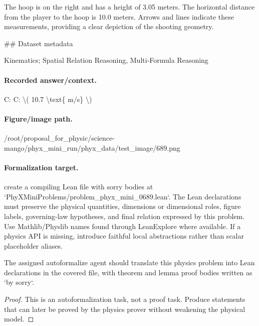 The hoop is on the right and has a height of 3.05 meters. The horizontal distance from the player to the hoop is 10.0 meters. Arrows and lines indicate these measurements, providing a clear depiction of the shooting geometry.

\#\# Dataset metadata

Kinematics; Spatial Relation Reasoning, Multi-Formula Reasoning

\paragraph{Recorded answer/context.}
C: C: \textbackslash{}( 10.7 \textbackslash{}text\{ m/s\} \textbackslash{})

\paragraph{Figure/image path.}
/root/proposal\_for\_physic/science-mango/phyx\_mini\_run/phyx\_data/test\_image/689.png

\paragraph{Formalization target.}
create a compiling Lean file with sorry bodies at `PhyXMiniProblems/problem\_phyx\_mini\_0689.lean`. The Lean declarations must preserve the physical quantities, dimensions or dimensional roles, figure labels, governing-law hypotheses, and final relation expressed by this problem.
Use Mathlib/Physlib names found through LeanExplore where available. If a physics API is missing, introduce faithful local abstractions rather than scalar placeholder aliases.

\begin{theorem}
\label{thm:physics:phyx_mini_0689:target}
The assigned autoformalize agent should translate this physics problem into Lean declarations in the covered file, with theorem and lemma proof bodies written as `by sorry`.
\end{theorem}
\begin{proof}
This is an autoformalization task, not a proof task. Produce statements that can later be proved by the physics prover without weakening the physical model.
\end{proof}


